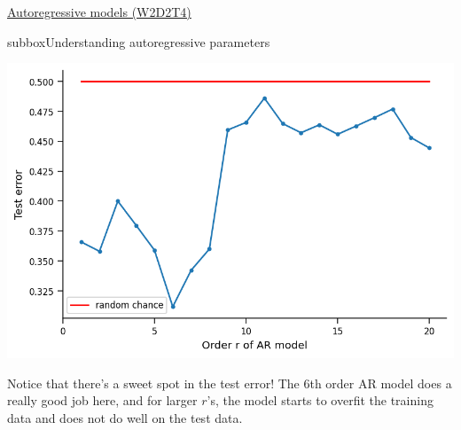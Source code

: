 \begin{textbox}{\href{https://compneuro.neuromatch.io/tutorials/W2D2_LinearSystems/student/W2D2_Tutorial4.html}{Autoregressive models (W2D2T4)} }
\begin{subbox}{subbox}{Understanding autoregressive parameters}
\begin{center}
\includegraphics[scale=0.25]{Figures/LS/CDS_Figure13.png}
\end{center}


Notice that there's a sweet spot in the test error! The 6th order AR model does a really good job here, and for larger $r$'s, the model starts to overfit the training data and does not do well on the test data.

\end{subbox}
\end{textbox}
